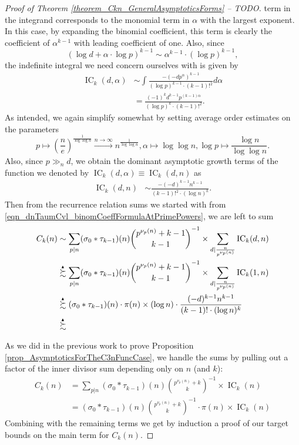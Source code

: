 \documentclass[11pt,reqno,a4letter]{article}
\numberwithin{figure}{section}
\numberwithin{table}{section}
\theoremstyle{plain}
\numberwithin{theorem}{section}
\theoremstyle{definition}
\newcommand{\SuccSim}[0]{\overset{_{\scriptsize{\blacktriangle}}}{\succsim}}
\begin{document}
\begin{proof}[Proof of Theorem \ref{theorem_Ckn_GeneralAsymptoticsForms} -- TODO]
term in the integrand corresponds to the monomial term in $\alpha$ with the largest exponent. 
In this case, by expanding the binomial coefficient, this term is clearly the 
coefficient of $\alpha^{k-1}$ with leading coefficient of one. 
Also, since 
\[
\left(\log d + \alpha \cdot \log p\right)^{k-1} \sim \alpha^{k-1} \cdot (\log p)^{k-1}, 
\]
the indefinite integral we need concern ourselves with is given by 
\begin{align*} 
\operatorname{IC}_k(d, \alpha) & \sim \int \frac{-(-dp^{\alpha})^{k-1}}{(\log p)^{k-1} \cdot (k-1)!^2} d\alpha \\ 
     & = \frac{(-1)^{k} d^{k-1} p^{(k-1)\alpha}}{(\log p)^{k} \cdot (k-1)!^2}. 
\end{align*} 
As intended, we again simplify somewhat by setting average order estimates on the parameters 
$$p \mapsto \left(\frac{n}{e}\right)^{\frac{1}{\log\log n}} \xrightarrow{n \rightarrow \infty} 
     n^{\frac{1}{\log\log n}}, \alpha \mapsto \log\log n, 
     \log p \mapsto \frac{\log n}{\log\log n}.$$ 
Also, since $p \gg_{n} d$, we obtain the dominant asymptotic growth terms of the function 
we denoted by $\operatorname{IC}_k(d, \alpha) \equiv \operatorname{IC}_k(d, n)$ as 
\begin{align*} 
\operatorname{IC}_k(d, n) & \sim \frac{-(-d)^{k-1} n^{k-1}}{(k-1)!^2 \cdot (\log n)^k}. 
\end{align*} 
Then from the recurrence relation sums we started with from 
\eqref{eqn_dnTaumCvl_binomCoeffFormulaAtPrimePowers}, we are left to sum 
\begin{align*} 
C_k(n) & \sim \sum_{p|n} (\sigma_0 \ast \tau_{k-1})(n) 
     \binom{p^{\nu_p(n)} + k-1}{k-1}^{-1} \times \sum_{d|\frac{n}{p^{\nu_p(n)}}} \operatorname{IC}_k(d, n) \\ 
     & \SuccSim \sum_{p|n} (\sigma_0 \ast \tau_{k-1})(n) 
     \binom{p^{\nu_p(n)} + k-1}{k-1}^{-1} \times \sum_{d|\frac{n}{p^{\nu_p(n)}}} \operatorname{IC}_k(1, n) \\ 
     & \SuccSim 
     (\sigma_0 \ast \tau_{k-1})(n) 
     \cdot \pi(n) \times (\log n) \cdot 
     \frac{(-d)^{k-1} n^{k-1}}{(k-1)! \cdot (\log n)^k} \\ 
     & \SuccSim 
\end{align*} 

\vskip 2in

As we did in the previous work to prove Proposition \ref{prop_AsymptoticsForTheC3nFuncCase}, 
we handle the sums by pulling out a factor of the inner 
divisor sum depending only on $n$ (and $k$): 
\begin{align*} 
C_k(n) & = \sum_{p|n} (\sigma_0 \ast \tau_{k-1})(n) 
     \binom{p^{\nu_p(n)} + k}{k}^{-1} \times \operatorname{IC}_k(n) \\ 
     & = (\sigma_0 \ast \tau_{k-1})(n) 
     \binom{p^{\nu_p(n)} + k}{k}^{-1} \cdot \pi(n) \times \operatorname{IC}_k(n)
\end{align*} 
Combining with the remaining terms we get by induction a proof of our target bounds 
on the main term for $C_k(n)$. 


\end{proof}
\end{document}

